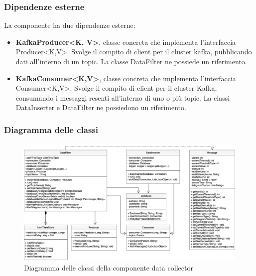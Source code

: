 		\subsubsection{Dipendenze esterne}
			La componente ha due dipendenze esterne:
			\begin{itemize}
				\item \textbf{KafkaProducer<K, V>}, classe concreta che implementa l'interfaccia Producer<K,V>. Svolge il compito di client per il cluster kafka, pubblicando dati all'interno di un topic. La classe DataFilter ne possiede un riferimento.
				\item \textbf{KafkaConsumer<K,V>}, classe concreta che implementa l'interfaccia Consumer<K,V>. Svolge il compito di client per il cluster Kafka, consumando i messaggi resenti all'interno di uno o più topic. La classi DataInserter e DataFilter ne possiedono un riferimento.	
			\end{itemize}	
		\begin{landscape}
		\subsubsection{Diagramma delle classi}%
			\begin{figure}[H]
				\centering
				\includegraphics[scale=0.550]{res/images/DATACOLLECTOR/ClassikafkaDataCollector.png}
				\caption{Diagramma delle classi della componente data collector}
				\label{Diagramma 6}
			\end{figure}
		\end{landscape}
